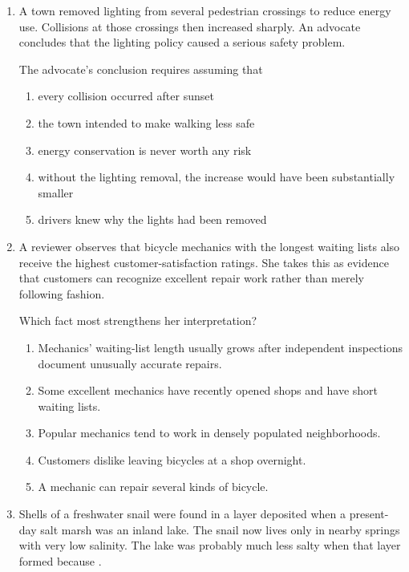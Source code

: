 \begin{enumerate}
\item A town removed lighting from several pedestrian crossings to reduce energy use. Collisions at those crossings then increased sharply. An advocate concludes that the lighting policy caused a serious safety problem.

The advocate's conclusion requires assuming that
\begin{enumerate}
\item every collision occurred after sunset
\item the town intended to make walking less safe
\item energy conservation is never worth any risk
\item without the lighting removal, the increase would have been substantially smaller
\item drivers knew why the lights had been removed
\end{enumerate}

\item A reviewer observes that bicycle mechanics with the longest waiting lists also receive the highest customer-satisfaction ratings. She takes this as evidence that customers can recognize excellent repair work rather than merely following fashion.

Which fact most strengthens her interpretation?
\begin{enumerate}
\item Mechanics' waiting-list length usually grows after independent inspections document unusually accurate repairs.
\item Some excellent mechanics have recently opened shops and have short waiting lists.
\item Popular mechanics tend to work in densely populated neighborhoods.
\item Customers dislike leaving bicycles at a shop overnight.
\item A mechanic can repair several kinds of bicycle.
\end{enumerate}

\item Shells of a freshwater snail were found in a layer deposited when a present-day salt marsh was an inland lake. The snail now lives only in nearby springs with very low salinity. The lake was probably much less salty when that layer formed because \underline{\hspace{1.6in}}.


\end{enumerate}

